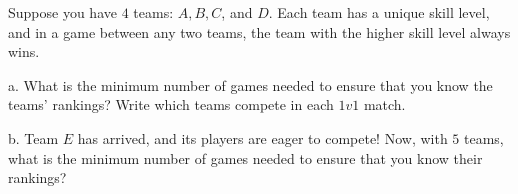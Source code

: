 Suppose you have $4$ teams: $A, B, C$, and $D$. Each team has a unique skill level, and in a game between any two teams, the team with the higher skill level always wins.

a. What is the minimum number of games needed to ensure that you know the teams' rankings? Write which teams compete in each $1v1$ match.

b. Team $E$ has arrived, and its players are eager to compete! Now, with $5$ teams, what is the minimum number of games needed to ensure that you know their rankings?
